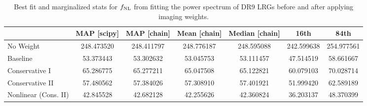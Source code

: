 \begin{table}
  \begin{center}
    \caption{Best fit and marginalized stats for $f_{\rm NL}$ from fitting the power spectrum of DR9 LRGs before and after applying imaging weights.}
    \label{tab:mocksmcmc}
    \begin{tabular}{lcccccc}
    \hline
    \hline
    & MAP [scipy] & MAP [chain]  &	Mean [chain]	& Median [chain] &	16th	& 84th \\
    \hline
No Weight&	248.473520	&248.411797	&248.776187	&248.595088&	242.599638&	254.977561\\
Baseline	&53.373443	&53.302632	&53.045753	&53.111457	&47.514519	&58.661667\\
Conservative I	&65.286775	&65.277211	&65.047508&	65.122821&	60.079103&	70.028714\\
Conservative II	&57.480562	&57.384026	&57.308910&	57.401921&	51.999420&	62.589189\\
Nonlinear (Cons. II)	&42.845528	&42.682128	&42.255626&	42.360824&	36.203137&	48.370399

    \end{tabular}
  \end{center}
\end{table}

%
